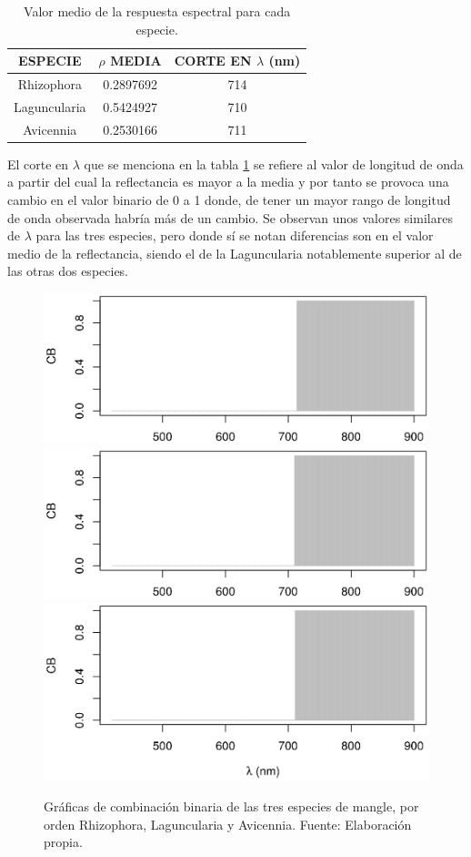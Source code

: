 \begin{table}[ht]
	\centering
	\caption[Valores medios de la respuesta espectral]{Valor medio de la respuesta espectral para cada especie.}
	\begin{tabular}{|c|c|c|}
	\hline
	ESPECIE & $\rho$ MEDIA & CORTE EN $\lambda$ (nm)\\
	\hline
	Rhizophora & 0.2897692 & 714	\\
	\hline
	Laguncularia & 0.5424927 & 710\\
	\hline
	Avicennia & 0.2530166 & 711\\
	\hline
	\end{tabular}
	\label{tab:mediaIAE}
\end{table}

El corte en $\lambda$ que se menciona en la tabla \ref{tab:mediaIAE} se refiere al valor de longitud de onda a partir del cual la reflectancia es mayor a la media y por tanto se provoca una cambio en el valor binario de 0 a 1 donde, de tener un mayor rango de longitud de onda observada habría más de un cambio. Se observan unos valores similares de $\lambda$ para las tres especies, pero donde sí se notan diferencias son en el valor medio de la reflectancia, siendo el de la Laguncularia notablemente superior al de las otras dos especies.

\begin{figure}
	\centering
	\includegraphics[width=0.8\linewidth]{./Imagenes/IAE_RM.eps}
	\includegraphics[width=0.8\linewidth]{./Imagenes/IAE_LR.eps}
	\includegraphics[width=0.8\linewidth]{./Imagenes/IAE_AG.eps}
	\caption[Gráficas de combinación binaria]{Gráficas de combinación binaria de las tres especies de mangle, por orden Rhizophora, Laguncularia y Avicennia. Fuente: Elaboración propia.}
	\label{fig:CB}
\end{figure}

